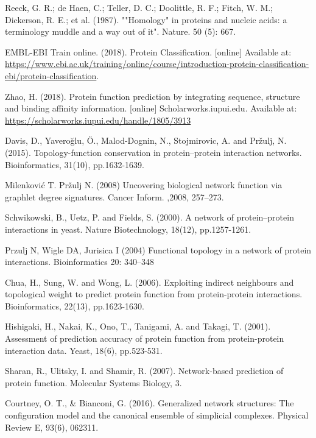 \documentclass[9pt]{article}
\begin{document}
\begin{thebibliography}{8}
Reeck, G. R.; de Haen, C.; Teller, D. C.; Doolittle, R. F.; Fitch, W. M.; Dickerson, R. E.; et al. (1987). ""Homology" in proteins and nucleic acids: a terminology muddle and a way out of it". Nature. 50 (5): 667.

EMBL-EBI Train online. (2018). Protein Classification. [online] Available at: \url{https://www.ebi.ac.uk/training/online/course/introduction-protein-classification-ebi/protein-classification}.

Zhao, H. (2018). Protein function prediction by integrating sequence, structure and binding affinity information. [online] Scholarworks.iupui.edu. Available at: \url{https://scholarworks.iupui.edu/handle/1805/3913}

Davis, D., Yaveroğlu, Ö., Malod-Dognin, N., Stojmirovic, A. and Pržulj, N. (2015). Topology-function conservation in protein–protein interaction networks. Bioinformatics, 31(10), pp.1632-1639.

Milenković T. Pržulj N. (2008) Uncovering biological network function via graphlet degree signatures. Cancer Inform. ,2008, 257–273.

Schwikowski, B., Uetz, P. and Fields, S. (2000). A network of protein–protein interactions in yeast. Nature Biotechnology, 18(12), pp.1257-1261.

Przulj N, Wigle DA, Jurisica I (2004) Functional topology in a network of protein interactions. Bioinformatics 20: 340–348

Chua, H., Sung, W. and Wong, L. (2006). Exploiting indirect neighbours and topological weight to predict protein function from protein-protein interactions. Bioinformatics, 22(13), pp.1623-1630.

Hishigaki, H., Nakai, K., Ono, T., Tanigami, A. and Takagi, T. (2001). Assessment of prediction accuracy of protein function from protein-protein interaction data. Yeast, 18(6), pp.523-531.

Sharan, R., Ulitsky, I. and Shamir, R. (2007). Network-based prediction of protein function. Molecular Systems Biology, 3.

Courtney, O. T., \& Bianconi, G. (2016). Generalized network structures: The configuration model and the canonical ensemble of simplicial complexes. Physical Review E, 93(6), 062311. 


\end{thebibliography}
\end{document}
